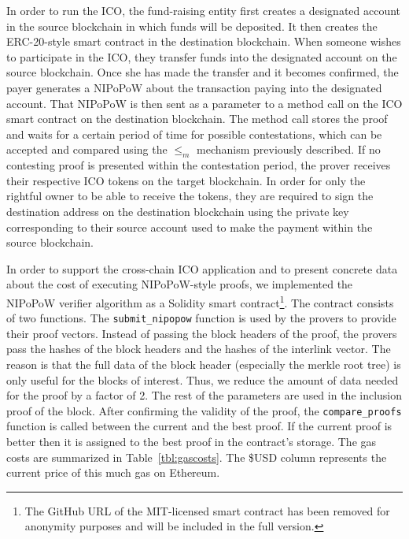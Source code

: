 In order to run the ICO, the fund-raising entity first creates a designated
account in the source blockchain in which funds will be deposited. It then
creates the ERC-20-style smart contract in the destination blockchain. When
someone wishes to participate in the ICO, they transfer funds into the
designated account on the source blockchain. Once she has made the transfer and
it becomes confirmed, the payer generates a NIPoPoW about the transaction paying
into the designated account. That NIPoPoW is then sent as a parameter to a
method call on the ICO smart contract on the destination blockchain. The method
call stores the proof and waits for a certain period of time for possible
contestations, which can be accepted and compared using the $\leq_m$ mechanism
previously described. If no contesting proof is presented within the
contestation period, the prover receives their respective ICO tokens on the
target blockchain. In order for only the rightful owner to be able to receive
the tokens, they are required to sign the destination address on the destination
blockchain using the private key corresponding to their source account used to
make the payment within the source blockchain.

In order to support the cross-chain ICO application and to present concrete data
about the cost of executing NIPoPoW-style proofs, we implemented the NIPoPoW
verifier algorithm as a Solidity smart contract\footnote{The GitHub URL of the
MIT-licensed smart contract has been removed for anonymity purposes and will
be included in the full version.}. The contract consists of two functions.
The \texttt{submit\_nipopow} function is used by the provers to provide their
proof vectors. Instead of passing the block headers of the proof, the provers
pass the hashes of the block headers and the hashes of the interlink vector. The
reason is that the full data of the block header (especially the merkle root
tree) is only useful for the blocks of interest. Thus, we reduce the amount of
data needed for the proof by a factor of 2. The rest of the parameters are used
in the inclusion proof of the block. After confirming the validity of the proof,
the \texttt{compare\_proofs} function is called between the current and the best
proof. If the current proof is better then it is assigned to the best proof in
the contract's storage.
The gas costs are summarized in
Table~\ref{tbl:gascosts}. The \$USD column represents the current price of this
much gas on Ethereum.

